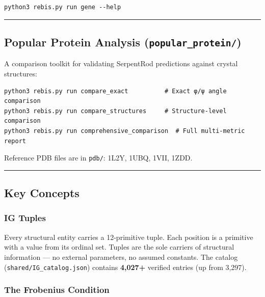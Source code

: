 \documentclass[12pt,a4paper]{article}
\begin{document}
\begin{verbatim}
python3 rebis.py run gene --help
\end{verbatim}

\begin{center}\rule{0.5\linewidth}{0.5pt}\end{center}

\hypertarget{popular-protein-analysis-popular_protein}{%
\subsection{\texorpdfstring{Popular Protein Analysis
(\texttt{popular\_protein/})}{Popular Protein Analysis (popular\_protein/)}}\label{popular-protein-analysis-popular_protein}}

A comparison toolkit for validating SerpentRod predictions against
crystal structures:

\begin{verbatim}
python3 rebis.py run compare_exact          # Exact φ/ψ angle comparison
python3 rebis.py run compare_structures     # Structure-level comparison
python3 rebis.py run comprehensive_comparison  # Full multi-metric report
\end{verbatim}

Reference PDB files are in \texttt{pdb/}: 1L2Y, 1UBQ, 1VII, 1ZDD.

\begin{center}\rule{0.5\linewidth}{0.5pt}\end{center}

\hypertarget{key-concepts}{%
\subsection{Key Concepts}\label{key-concepts}}

\hypertarget{ig-tuples}{%
\subsubsection{IG Tuples}\label{ig-tuples}}

Every structural entity carries a 12-primitive tuple. Each position is a
primitive with a value from its ordinal set. Tuples are the sole
carriers of structural information --- no external parameters, no
assumed constants. The catalog (\texttt{shared/IG\_catalog.json})
contains \textbf{4,027+} verified entries (up from 3,297).

\hypertarget{the-frobenius-condition}{%
\subsubsection{The Frobenius Condition}\label{the-frobenius-condition}}
\end{document}
